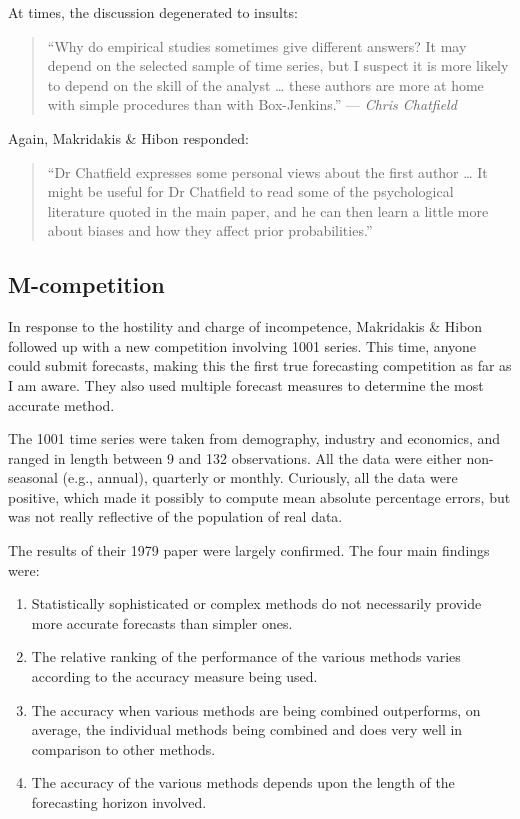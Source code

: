\documentclass[11pt,a4paper,]{article}
\providecommand{\tightlist}{%
  \setlength{\itemsep}{0pt}\setlength{\parskip}{0pt}}
\begin{document}
At times, the discussion degenerated to insults:

\begin{quote}
``Why do empirical studies sometimes give different answers? It may depend on the selected sample of time series, but I suspect it is more likely to depend on the skill of the analyst \ldots{} these authors are more at home with simple procedures than with Box-Jenkins.'' --- \emph{Chris Chatfield}
\end{quote}

Again, Makridakis \& Hibon responded:

\begin{quote}
``Dr Chatfield expresses some personal views about the first author \ldots{} It might be useful for Dr Chatfield to read some of the psychological literature quoted in the main paper, and he can then learn a little more about biases and how they affect prior probabilities.''
\end{quote}

\hypertarget{m-competition}{%
\subsection*{M-competition}\label{m-competition}}

In response to the hostility and charge of incompetence, Makridakis \& Hibon followed up with a new competition involving 1001 series. This time, anyone could submit forecasts, making this the first true forecasting competition as far as I am aware. They also used multiple forecast measures to determine the most accurate method.

The 1001 time series were taken from demography, industry and economics, and ranged in length between 9 and 132 observations. All the data were either non-seasonal (e.g., annual), quarterly or monthly. Curiously, all the data were positive, which made it possibly to compute mean absolute percentage errors, but was not really reflective of the population of real data.

The results of their 1979 paper were largely confirmed. The four main findings \autocite[taken from][]{M3} were:

\begin{enumerate}
\def\labelenumi{\arabic{enumi}.}
\tightlist
\item
  Statistically sophisticated or complex methods do not necessarily provide more accurate forecasts than simpler ones.
\item
  The relative ranking of the performance of the various methods varies according to the accuracy measure being used.
\item
  The accuracy when various methods are being combined outperforms, on average, the individual methods being combined and does very well in comparison to other methods.
\item
  The accuracy of the various methods depends upon the length of the forecasting horizon involved.
\end{enumerate}
\end{document}
